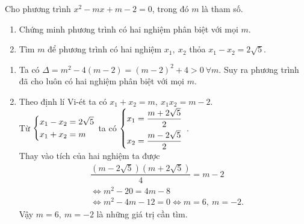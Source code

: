 \begin{ex}%
\hfill

Cho phương trình $x^2-mx+m-2=0$, trong đó $m$ là tham số.
\begin{enumerate}
   \item Chứng minh phương trình có hai nghiệm phân biệt với mọi $m$.
   \item Tìm $m$ để phương trình có hai nghiệm $x_1,\ x_2$ thỏa $x_1-x_2=2\sqrt{5}$.
\end{enumerate}
    
\loigiai
    {
    \begin{enumerate}
    \item Ta có $\Delta =m^2-4\left( m-2 \right)=\left( m-2 \right)^2+4>0\  \forall m$. Suy ra phương trình đã cho luôn có hai nghiệm phân biệt với mọi $m.$ 
\item Theo định lí Vi-ét ta có $x_1+x_2=m,\ x_1x_2=m-2.$\\ 
Từ $\left\{\begin{aligned}  & x_1-x_2=2\sqrt{5} \\  & x_1+x_2=m \end{aligned}\right. $ ta có $\left\{\begin{aligned}
  & x_1=\dfrac{m+2\sqrt{5}}{2} \\  & x_2=\dfrac{m-2\sqrt{5}}{2}\end{aligned}\right.$ . \\
Thay vào tích của hai nghiệm ta được
$$\begin{aligned} & \dfrac{\left( m-2\sqrt{5} \right)\left( m+2\sqrt{5} \right)}{4}=m-2 \\ & \Leftrightarrow m^2-20=4m-8 \\& \Leftrightarrow m^2-4m-12=0\Leftrightarrow m=6,\ m=-2. \end{aligned}$$ 
Vậy $m=6,\ m=-2$ là những giá trị cần tìm.
    \end{enumerate}
    }
\end{ex}

